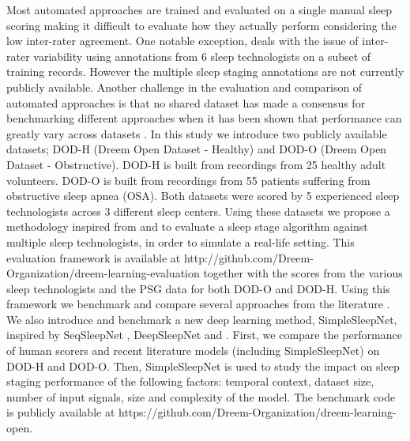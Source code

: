 \documentclass[journal]{IEEEtran}
\begin{document}
Most automated approaches are trained and evaluated on a single manual sleep scoring making it difficult to evaluate how they actually perform considering the low inter-rater agreement. One notable exception, \cite{Stephansen2018} deals with the issue of inter-rater variability using annotations from 6 sleep technologists on a subset of training records. However the multiple sleep staging annotations are not currently publicly available. Another challenge in the evaluation and comparison of automated approaches is that no shared dataset has made a consensus for benchmarking different approaches when it has been shown that performance can greatly vary across datasets \cite{Chambon2018transfer}.
In this study we introduce two publicly available datasets; DOD-H (Dreem Open Dataset - Healthy) and DOD-O (Dreem Open Dataset - Obstructive). DOD-H is built from recordings from 25 healthy adult volunteers. DOD-O is built from recordings from 55 patients suffering from obstructive sleep apnea (OSA). Both datasets were scored by 5 experienced sleep technologists across 3 different sleep centers.
Using these datasets we propose a methodology inspired from \cite{Stephansen2018} and \cite{Arnal662734} to evaluate a sleep stage algorithm against multiple sleep technologists, in order to simulate a real-life setting. This evaluation framework is available at http://github.com/Dreem-Organization/dreem-learning-evaluation together with the scores from the various sleep technologists and the PSG data for both DOD-O and DOD-H.
Using this framework we benchmark and compare several approaches from the literature \cite{Supratak2017} \cite{Phan2019} \cite{Chambon2018} \cite{Tsinalis2016} \cite{Tsinalis2016a}. We also introduce and benchmark a new deep learning method, SimpleSleepNet, inspired by SeqSleepNet \cite{Phan2019}, DeepSleepNet \cite{Supratak2017} and \cite{Chambon2018}. 
First, we compare the performance of human scorers and recent literature models (including SimpleSleepNet) on DOD-H and DOD-O. Then, SimpleSleepNet is used to study the impact on sleep staging performance of the following factors: temporal context, dataset size, number of input signals, size and complexity of the model.
The benchmark code is publicly available at https://github.com/Dreem-Organization/dreem-learning-open.
 
\end{document}
